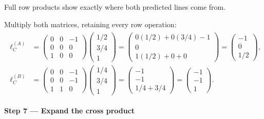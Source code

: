 \documentclass[letterpaper,11pt,english,openany,oneside]{jupyterBook}
\begin{document}
\sphinxAtStartPar
{} Full row products show exactly where both predicted lines come from.

\sphinxAtStartPar
Multiply both matrices, retaining every row operation:
{\color{QuizMathBlue} \begin{equation*}
\begin{split}
\begin{aligned}
\ell_C^{(A)}&=\begin{pmatrix}0&0&-1\\0&0&0\\1&0&0\end{pmatrix}\begin{pmatrix}1/2\\3/4\\1\end{pmatrix}
=\begin{pmatrix}0(1/2)+0(3/4)-1\\0\\1(1/2)+0+0\end{pmatrix}
=\begin{pmatrix}-1\\0\\1/2\end{pmatrix},\\
\ell_C^{(B)}&=\begin{pmatrix}0&0&-1\\0&0&-1\\1&1&0\end{pmatrix}\begin{pmatrix}1/4\\3/4\\1\end{pmatrix}
=\begin{pmatrix}-1\\-1\\1/4+3/4\end{pmatrix}
=\begin{pmatrix}-1\\-1\\1\end{pmatrix}.
\end{aligned}
\end{split}
\end{equation*}}
\par

\par\medskip{}
{\color{QuizStepRed}\bfseries Step 7 — Expand the cross product}\par\smallskip
\end{document}
